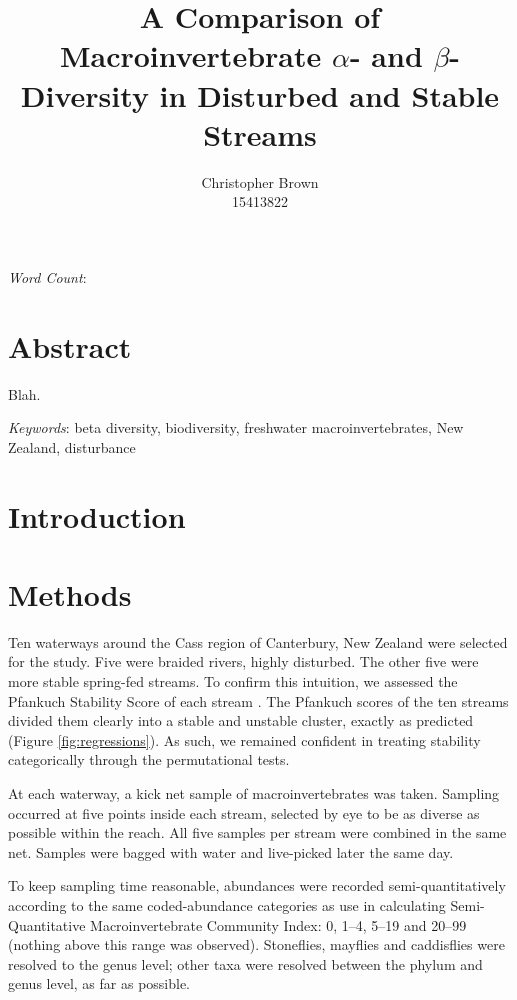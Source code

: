 \documentclass[a4paper,10pt]{article}
\title{A Comparison of Macroinvertebrate $\alpha$- and $\beta$-Diversity in Disturbed and Stable Streams}
\author{
	Christopher Brown\\15413822
}
\date{}
\begin{document}
\maketitle

\begin{center}
	\emph{Word Count}: %
\end{center}

\section*{Abstract}

Blah.

\bigskip\noindent\emph{Keywords}:
beta diversity,
biodiversity,
freshwater macroinvertebrates,
New Zealand,
disturbance

\clearpage

\section*{Introduction}

\section*{Methods}

Ten waterways around the Cass region of Canterbury, New Zealand were selected for the study.
Five were braided rivers, highly disturbed.
The other five were more stable spring-fed streams.
To confirm this intuition, we assessed the Pfankuch Stability Score of each stream \parencite{pfankuch, pfankuch-doc}.
The Pfankuch scores of the ten streams divided them clearly into a stable and unstable cluster, exactly as predicted (Figure \ref{fig:regressions}).
As such, we remained confident in treating stability categorically through the permutational tests.

At each waterway, a kick net sample of macroinvertebrates was taken.
Sampling occurred at five points inside each stream, selected by eye to be as diverse as possible within the reach.
All five samples per stream were combined in the same net.
Samples were bagged with water and live-picked later the same day.

To keep sampling time reasonable, abundances were recorded semi-quantitatively according to the same coded-abundance categories as use in calculating  Semi-Quantitative Macroinvertebrate Community Index:
0, 1--4, 5--19 and 20--99 (nothing above this range was observed).
Stoneflies, mayflies and caddisflies were resolved to the genus level; other taxa were resolved between the phylum and genus level, as far as possible.
\end{document}
